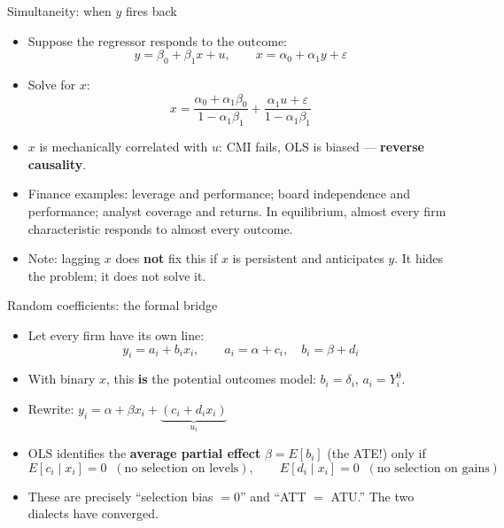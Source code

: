 \documentclass[
  11pt,
  ignorenonframetext,
  aspectratio=169,
]{beamer}
\providecommand{\tightlist}{%
  \setlength{\itemsep}{0pt}\setlength{\parskip}{0pt}}
\begin{document}
\begin{frame}{Simultaneity: when \(y\) fires back}
\protect{}\label{simultaneity-when-y-fires-back}
\begin{itemize}
\tightlist
\item
  Suppose the regressor responds to the outcome: \[
  y = \beta_0 + \beta_1 x + u, \qquad x = \alpha_0 + \alpha_1 y + \varepsilon
  \]
\item
  Solve for \(x\): \[
  x = \frac{\alpha_0 + \alpha_1 \beta_0}{1 - \alpha_1 \beta_1} + \frac{\alpha_1 u + \varepsilon}{1 - \alpha_1 \beta_1}
  \]
\item
  \(x\) is mechanically correlated with \(u\): CMI fails, OLS is biased
  --- \textbf{reverse causality}.
\item
  Finance examples: leverage and performance; board independence and
  performance; analyst coverage and returns. In equilibrium, almost
  every firm characteristic responds to almost every outcome.
\item
  Note: lagging \(x\) does \textbf{not} fix this if \(x\) is persistent
  and anticipates \(y\). It hides the problem; it does not solve it.
\end{itemize}
\end{frame}

\begin{frame}{Random coefficients: the formal bridge}
\protect{}\label{random-coefficients-the-formal-bridge}
\begin{itemize}
\tightlist
\item
  Let every firm have its own line: \[
  y_i = a_i + b_i x_i, \qquad a_i = \alpha + c_i, \quad b_i = \beta + d_i
  \]
\item
  With binary \(x\), this \textbf{is} the potential outcomes model:
  \(b_i = \delta_i\), \(a_i = Y_i^0\).
\item
  Rewrite:
  \(y_i = \alpha + \beta x_i + \underbrace{(c_i + d_i x_i)}_{u_i}\)
\item
  OLS identifies the \textbf{average partial effect} \(\beta = E[b_i]\)
  (the ATE!) only if \[
  E[c_i \mid x_i] = 0 \;\;(\text{no selection on levels}), \qquad E[d_i \mid x_i] = 0 \;\;(\text{no selection on gains})
  \]
\item
  These are precisely ``selection bias \(=0\)'' and ``ATT \(=\) ATU.''
  The two dialects have converged.
\end{itemize}
\end{frame}
\end{document}

